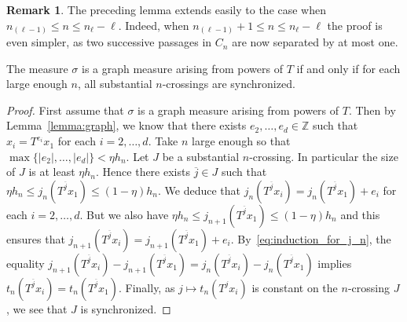 \documentclass[10pt]{amsart}
\theoremstyle{definition}\newtheorem{defi}[theo]{Definition}\newtheorem{rema}[theo]{Remark}\newtheorem{exam}[theo]{Example}\newtheorem{exem}[theo]{Example}\newtheorem{nota}[theo]{Notation}
\newcommand{\ZZ}{\mathbb{Z}}
\newcommand{\jb}{\overline{j}}
\begin{document}
\begin{rema}
The preceding lemma extends easily to the case when $n_{(\ell-1)}\le n\le n_\ell-\ell$. Indeed, when $n_{(\ell-1)}+1\le n\le n_\ell-\ell$ the proof is even simpler, as two successive passages in $C_n$ are now separated by at most one.
\end{rema}

\begin{prop}\label{prop:synchronized}
The measure $\sigma$ is a graph measure arising from powers of $T$ if and only if for each large enough $n$, all substantial $n$-crossings are synchronized.
\end{prop}

\begin{proof}
First assume that $\sigma$ is a graph measure arising from powers of $T$. Then by Lemma~\ref{lemma:graph}, we know that there exists $e_2,\ldots,e_d\in\ZZ$ such that $x_i=T^{e_i}x_1$ for each $i=2,\ldots,d$. Take $n$ large enough so that $\max\{|e_2|,\ldots,|e_d|\}<\eta h_n$. Let $J$ be a substantial $n$-crossing. In particular the size of $J$ is at least $\eta h_n$. Hence there exists $\jb\in J$ such that $\eta h_n\le j_n(T^{\jb} x_1) \le (1-\eta)h_n$. We deduce that $j_n(T^{\jb} x_i)= j_n(T^{\jb} x_1)+e_i$ for each $i=2,\ldots,d$. But we also have $\eta h_n\le j_{n+1}(T^{\jb} x_1) \le (1-\eta)h_n$ and this ensures that $j_{n+1}(T^{\jb} x_i)= j_{n+1}(T^{\jb} x_1)+e_i$. By~\eqref{eq:induction_for_j_n}, the equality $j_{n+1}(T^{\jb} x_i) - j_{n+1}(T^{\jb} x_1) = j_{n}(T^{\jb} x_i) - j_{n}(T^{\jb} x_1)$ implies $t_n(T^{\jb} x_i)=t_n(T^{\jb} x_1)$. Finally, as $j\mapsto t_n(T^jx_i)$ is constant on the $n$-crossing $J$, we see that $J$ is synchronized.


\end{proof}
\end{document}
